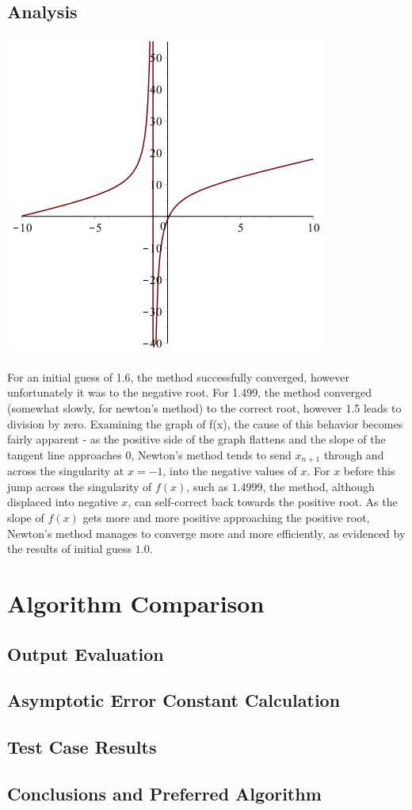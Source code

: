 \documentclass[11pt]{article} %
\begin{document}
\subsection*{Analysis}
\includegraphics[scale=.5]{plots/newtongraph1.png}


\par For an initial guess of 1.6, the method successfully converged, however unfortunately it was to the negative root. For 1.499, the method converged (somewhat slowly, for newton's method) to the correct root, however 1.5 leads to division by zero. Examining the graph of f(x), the cause of this behavior becomes fairly apparent - as the positive side of the graph flattens and the slope of the tangent line approaches $0$, Newton's method tends to send $x_{n+1}$ through and across the singularity at $x = -1$, into the negative values of $x$. For $x$ before this jump across the singularity of $f(x)$, such as $1.4999$, the method, although displaced into negative $x$, can self-correct back towards the positive root. As the slope of $f(x)$ gets more and more positive approaching the positive root, Newton's method manages to converge more and more efficiently, as evidenced by the results of initial guess $1.0$.


\section*{Algorithm Comparison}

\subsection*{Output Evaluation}

\subsection*{Asymptotic Error Constant Calculation}

\subsection*{Test Case Results}

\subsection*{Conclusions and Preferred Algorithm}
 
\end{document}

